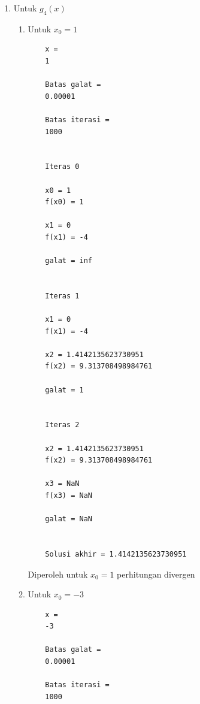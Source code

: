 \documentclass[12pt]{article}
\begin{document}
\begin{enumerate}
{\begin{enumerate}
{\begin{enumerate}
{\begin{lstlisting}
    x17 = 0.9157549868296531
    f(x17) = 0.00004097169610517426
    
    x18 = 0.915749558259892
    f(x18) = -0.00001759021102865077
    
    galat = 0.000005928006966622007
    
    
    Solusi akhir = 0.9157549868296531
                        \end{lstlisting}
                        Diperoleh hasil akhir $ x = 0.9157549868296531 $
                    }
                \end{enumerate}
            }
            \item {
                Untuk $ g_4(x) $
                \begin{enumerate}
                    \item {
                        Untuk $ x_0 = 1 $ 
                        \begin{lstlisting}
    x =
    1
    
    Batas galat =
    0.00001
    
    Batas iterasi =
    1000
    
    
    Iteras 0
    
    x0 = 1
    f(x0) = 1
    
    x1 = 0
    f(x1) = -4
    
    galat = inf
    
    
    Iteras 1
    
    x1 = 0
    f(x1) = -4
    
    x2 = 1.4142135623730951
    f(x2) = 9.313708498984761
    
    galat = 1
    
    
    Iteras 2
    
    x2 = 1.4142135623730951
    f(x2) = 9.313708498984761
    
    x3 = NaN
    f(x3) = NaN
    
    galat = NaN
    
    
    Solusi akhir = 1.4142135623730951
                        \end{lstlisting}
                        Diperoleh untuk $ x_0 = 1 $ perhitungan divergen
                    }
                    \item {
                        Untuk $ x_0 = -3 $
                        \begin{lstlisting}
    x =
    -3
    
    Batas galat =
    0.00001
    
    Batas iterasi =
    1000
    

\end{lstlisting}}
\end{enumerate}}
\end{enumerate}}
\end{enumerate}
\end{document}
